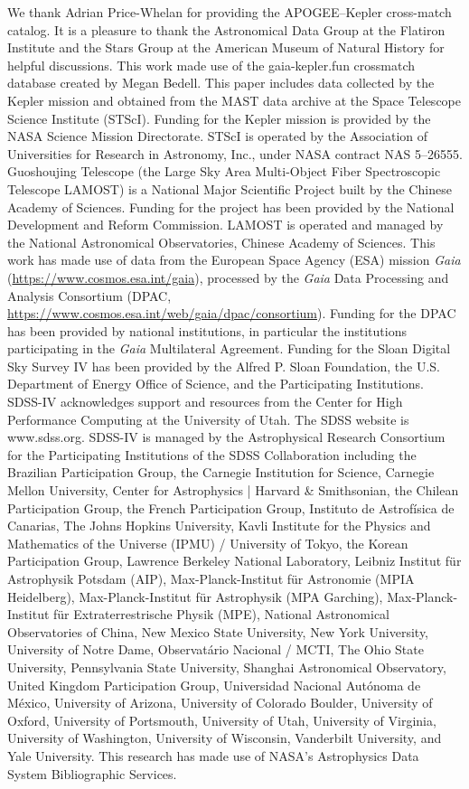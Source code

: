 \documentclass[twocolumn]{aastex631}
\begin{document}
\begin{acknowledgments}
We thank Adrian Price-Whelan for providing the APOGEE--Kepler cross-match catalog. It is a pleasure to thank the Astronomical Data Group at the Flatiron Institute and the Stars Group at the American Museum of Natural History for helpful discussions. This work made use of the gaia-kepler.fun crossmatch database created by Megan Bedell. This paper includes data collected by the Kepler mission and obtained from the MAST data archive at the Space Telescope Science Institute (STScI). Funding for the Kepler mission is provided by the NASA Science Mission Directorate. STScI is operated by the Association of Universities for Research in Astronomy, Inc., under NASA contract NAS 5–26555. Guoshoujing Telescope (the Large Sky Area Multi-Object Fiber Spectroscopic Telescope LAMOST) is a National Major Scientific Project built by the Chinese Academy of Sciences. Funding for the project has been provided by the National Development and Reform Commission. LAMOST is operated and managed by the National Astronomical Observatories, Chinese Academy of Sciences. This work has made use of data from the European Space Agency (ESA) mission {\it Gaia} (\url{https://www.cosmos.esa.int/gaia}), processed by the {\it Gaia} Data Processing and Analysis Consortium (DPAC, \url{https://www.cosmos.esa.int/web/gaia/dpac/consortium}). Funding for the DPAC has been provided by national institutions, in particular the institutions participating in the {\it Gaia} Multilateral Agreement. Funding for the Sloan Digital Sky Survey IV has been provided by the Alfred P. Sloan Foundation, the U.S. Department of Energy Office of Science, and the Participating Institutions. SDSS-IV acknowledges support and resources from the Center for High Performance Computing  at the University of Utah. The SDSS website is www.sdss.org. SDSS-IV is managed by the Astrophysical Research Consortium for the Participating Institutions of the SDSS Collaboration including the Brazilian Participation Group, the Carnegie Institution for Science, Carnegie Mellon University, Center for Astrophysics | Harvard \& Smithsonian, the Chilean Participation Group, the French Participation Group, Instituto de Astrof\'isica de Canarias, The Johns Hopkins University, Kavli Institute for the Physics and Mathematics of the Universe (IPMU) / University of Tokyo, the Korean Participation Group, Lawrence Berkeley National Laboratory, Leibniz Institut f\"ur Astrophysik Potsdam (AIP),  Max-Planck-Institut f\"ur Astronomie (MPIA Heidelberg), Max-Planck-Institut f\"ur Astrophysik (MPA Garching), Max-Planck-Institut f\"ur Extraterrestrische Physik (MPE), National Astronomical Observatories of China, New Mexico State University, New York University, University of Notre Dame, Observat\'ario Nacional / MCTI, The Ohio State University, Pennsylvania State University, Shanghai Astronomical Observatory, United Kingdom Participation Group, Universidad Nacional Aut\'onoma de M\'exico, University of Arizona, University of Colorado Boulder, University of Oxford, University of Portsmouth, University of Utah, University of Virginia, University of Washington, University of Wisconsin, Vanderbilt University, and Yale University. This research has made use of NASA's Astrophysics Data System Bibliographic Services.


\end{acknowledgments}
\end{document}
